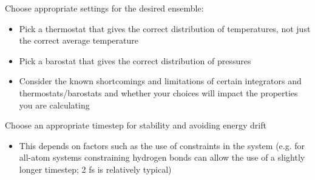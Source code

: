 \documentclass[9pt,bestpractices]{livecoms}
\begin{document}
\begin{Checklists*}[p!]
\begin{checklist}{Choose appropriate settings for the desired ensemble:}
\begin{itemize}
\item Pick a thermostat that gives the correct distribution of temperatures, not
    just the correct average temperature
\item Pick a barostat that gives the correct distribution of pressures
\item Consider the known shortcomings and limitations of certain integrators and
    thermostats/barostats and whether your choices will impact the properties
        you are calculating
\end{itemize}
\end{checklist}


\begin{checklist}{Choose an appropriate timestep for stability and avoiding energy drift}
\begin{itemize}
\item This depends on factors such as the use of constraints in the system (e.g.
    for all-atom systems constraining hydrogen bonds can allow the use of a
        slightly longer timestep; 2 fs is relatively typical)
\end{itemize}
\end{checklist}


\end{Checklists*}







\nocite{*}
{}
\end{document}

